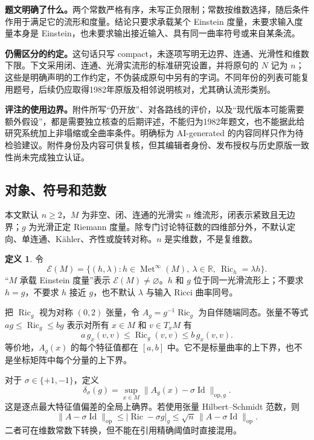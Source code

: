 \documentclass[11pt,a4paper]{article}
\theoremstyle{definition}
\newtheorem{definition}{定义}[section]
\newcommand{\Ric}{\operatorname{Ric}}
\newcommand{\id}{\operatorname{Id}}
\newcommand{\Met}{\operatorname{Met}}
\newcommand{\Ein}{\mathcal E}
\newcommand{\op}{\mathrm{op}}
\begin{document}
\textbf{题文明确了什么。}两个常数严格有序，未写正负限制；常数按维数选择，随后条件作用于满足它的流形和度量。结论只要求承载某个 Einstein 度量，未要求输入度量本身是 Einstein，也未要求输出接近输入、具有同一曲率符号或来自某条流。

\textbf{仍需区分的约定。}这句话只写 compact，未逐项写明无边界、连通、光滑性和维数下限。下文采用闭、连通、光滑实流形的标准研究设置，并将原句的 $N$ 记为 $n$；这些是明确声明的工作约定，不伪装成原句中另有的字词。不同年份的列表可能复用题号，后续仍应取得1982年原版及相邻说明核对，尤其确认流形类别。

\textbf{评注的使用边界。}附件所写“仍开放”、对各路线的评价，以及“现代版本可能需要额外假设”，都是需要独立核查的后期评述，不能归为1982年题文，也不能据此给研究系统加上非塌缩或全曲率条件。明确标为 AI-generated 的内容同样只作为待检验建议。附件身份及内容可供复核，但其编辑者身份、发布授权与历史原版一致性尚未完成独立认证。

\subsection{对象、符号和范数}

本文默认 $n\ge2$，$M$ 为非空、闭、连通的光滑实 $n$ 维流形，闭表示紧致且无边界；$g$ 为光滑正定 Riemann 度量。除专门讨论特征数的四维部分外，不默认定向、单连通、Kähler、齐性或旋转对称。$n$ 是实维数，不是复维数。

\begin{definition}
令
\[
\Ein(M)=\{(h,\lambda):h\in\Met^\infty(M),\ \lambda\in\mathbb R,
\ \Ric_h=\lambda h\}.
\]
“$M$ 承载 Einstein 度量”表示 $\Ein(M)\ne\varnothing$。$h$ 和 $g$ 位于同一光滑流形上；不要求 $h=g$，不要求 $h$ 接近 $g$，也不默认 $\lambda$ 与输入 Ricci 曲率同号。
\end{definition}

把 $\Ric_g$ 视为对称 $(0,2)$ 张量，令 $A_g=g^{-1}\Ric_g$ 为自伴随端同态。张量不等式 $ag\le\Ric_g\le bg$ 表示对所有 $x\in M$ 和 $v\in T_xM$ 有
\[
a\,g_x(v,v)\le\Ric_g(v,v)\le b\,g_x(v,v).
\]
等价地，$A_g(x)$ 的每个特征值都在 $[a,b]$ 中。它不是标量曲率的上下界，也不是坐标矩阵中每个分量的上下界。

对于 $\sigma\in\{+1,-1\}$，定义
\begin{equation}\label{eq:delta}
\delta_\sigma(g)=\sup_{x\in M}\|A_g(x)-\sigma\id\|_{\op,g}.
\end{equation}
这是逐点最大特征值偏差的全局上确界。若使用张量 Hilbert--Schmidt 范数，则
\[
\|A-\sigma\id\|_{\op}\le|\Ric-\sigma g|_g
\le\sqrt n\,\|A-\sigma\id\|_{\op}.
\]
二者可在维数常数下转换，但不能在引用精确阈值时直接混用。
\end{document}
